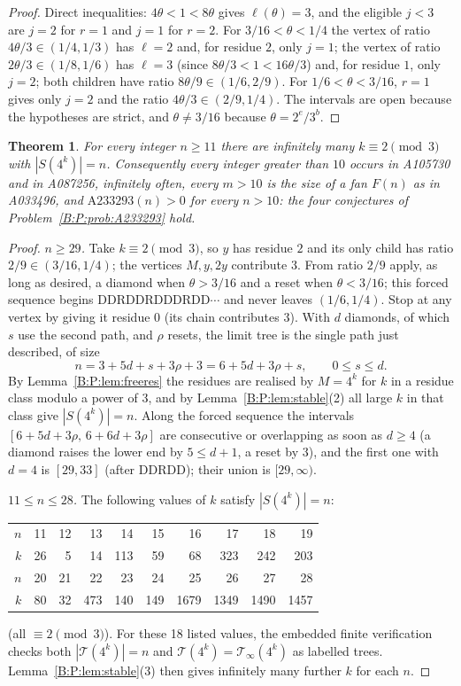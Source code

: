 \documentclass[11pt,a4paper]{article}
\newtheorem{theorem}{Theorem}[section]
\theoremstyle{definition}
\theoremstyle{remark}
\numberwithin{equation}{section}
\begin{document}
\begin{proof}
Direct inequalities: $4\theta<1<8\theta$ gives $\ell(\theta)=3$, and the eligible
$j<3$ are $j=2$ for $r=1$ and $j=1$ for $r=2$. For $3/16<\theta<1/4$ the vertex of
ratio $4\theta/3\in(1/4,1/3)$ has $\ell=2$ and, for residue $2$, only $j=1$; the
vertex of ratio $2\theta/3\in(1/8,1/6)$ has $\ell=3$ (since $8\theta/3<1<16\theta/3$)
and, for residue $1$, only $j=2$; both children have ratio $8\theta/9\in(1/6,2/9)$.
For $1/6<\theta<3/16$, $r=1$ gives only $j=2$ and the ratio $4\theta/3\in(2/9,1/4)$.
The intervals are open because the hypotheses are strict, and $\theta\ne3/16$ because $\theta=2^e/3^b$.
\end{proof}

\begin{theorem}\label{B:P:thm:A105730}
For every integer $n\ge11$ there are infinitely many $k\equiv2\pmod3$ with
$|S(4^k)|=n$. Consequently every integer greater than $10$ occurs in A105730
and in A087256, infinitely often, every $m>10$ is the size of a fan $F(n)$ as in
A033496, and $\mathrm{A233293}(n)>0$ for every $n>10$: the four conjectures of
Problem~\ref{B:P:prob:A233293} hold.
\end{theorem}

\begin{proof}
\emph{$n\ge29$.} Take $k\equiv2\pmod3$, so $y$ has residue $2$ and its only
child has ratio $2/9\in(3/16,1/4)$; the vertices $M,y,2y$ contribute $3$. From
ratio $2/9$ apply, as long as desired, a diamond when $\theta>3/16$ and a reset
when $\theta<3/16$; this forced sequence begins
$\mathrm{DDRDDRDDDRDD}\cdots$ and never leaves $(1/6,1/4)$. Stop at any vertex by
giving it residue $0$ (its chain contributes $3$). With $d$ diamonds, of which
$s$ use the second path, and $\rho$ resets, the limit tree is the single path
just described, of size
\[
 n=3+5d+s+3\rho+3=6+5d+3\rho+s,\qquad0\le s\le d .
\]
By Lemma~\ref{B:P:lem:freeres} the residues are realised by $M=4^k$ for $k$ in a
residue class modulo a power of $3$, and by Lemma~\ref{B:P:lem:stable}(2) all large
$k$ in that class give $|S(4^k)|=n$. Along the forced sequence the intervals
$[6+5d+3\rho,\,6+6d+3\rho]$ are consecutive or overlapping as soon as $d\ge4$ (a
diamond raises the lower end by $5\le d+1$, a reset by $3$), and the first one
with $d=4$ is $[29,33]$ (after $\mathrm{DDRDD}$); their union is $[29,\infty)$.

\emph{$11\le n\le28$.} The following values of $k$ satisfy $|S(4^k)|=n$:
\begin{center}\small
\begin{tabular}{r|rrrrrrrrr}
$n$&11&12&13&14&15&16&17&18&19\\
$k$&26&5&14&113&59&68&323&242&203\\\hline
$n$&20&21&22&23&24&25&26&27&28\\
$k$&80&32&473&140&149&1679&1349&1490&1457
\end{tabular}
\end{center}
(all $\equiv2\pmod3$). For these 18 listed values, the embedded finite
verification checks both $|\mathcal T(4^k)|=n$ and
$\mathcal T(4^k)=\mathcal T_\infty(4^k)$ as labelled trees.
Lemma~\ref{B:P:lem:stable}(3) then gives infinitely many further $k$ for each $n$.
\end{proof}
\end{document}

